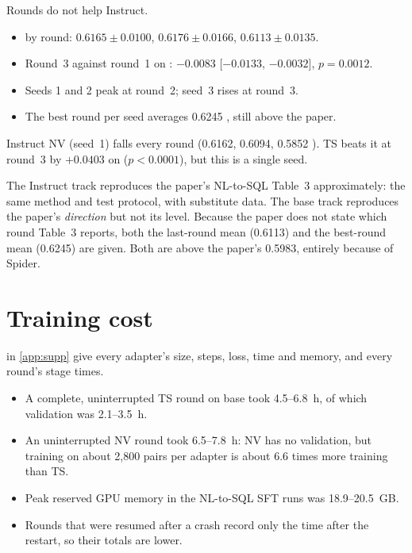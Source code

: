 \begin{observation}
Rounds do not help Instruct.
\begin{itemize}
\item \ZSiv{} by round: $0.6165\pm0.0100$, $0.6176\pm0.0166$, $0.6113\pm0.0135$.
\item Round~3 against round~1 on \Mviii{}: $-0.0083$ [$-0.0133$, $-0.0032$], $p=0.0012$.
\item Seeds 1 and 2 peak at round~2; seed~3 rises at round~3.
\item The best round per seed averages 0.6245 \ZSiv{}, still above the paper.
\end{itemize}
Instruct NV (seed~1) falls every round (0.6162, 0.6094, 0.5852 \ZSiv{}). TS beats it at round~3 by $+0.0403$ on
\Mviii{} ($p<0.0001$), but this is a single seed.
\end{observation}

\begin{interpretation}
The Instruct track reproduces the paper's NL-to-SQL Table~3 approximately: the same method and test protocol, with
substitute data. The base track reproduces the paper's \emph{direction} but not its level. Because the paper does not
state which round Table~3 reports, both the last-round mean (0.6113) and the best-round mean (0.6245) are given. Both
are above the paper's 0.5983, entirely because of Spider.
\end{interpretation}

\section{Training cost}

 in \cref{app:supp} give every adapter's size, steps, loss, time and memory, and
every round's stage times.
\begin{itemize}
\item A complete, uninterrupted TS round on base took 4.5--6.8~h, of which validation was 2.1--3.5~h.
\item An uninterrupted NV round took 6.5--7.8~h: NV has no validation, but training on about 2,800 pairs per adapter is about 6.6 times more training than TS.
\item Peak reserved GPU memory in the NL-to-SQL SFT runs was 18.9--20.5~GB.
\item Rounds that were resumed after a crash record only the time after the restart, so their totals are lower.
\end{itemize}
